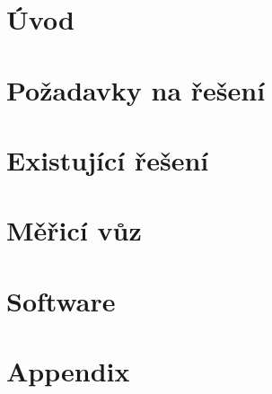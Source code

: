 \documentclass[digital, oneside, table, nolot, nolof]{fithesis3}
\begin{document}
\chapter{Úvod} \label{chap:uvod}


\chapter{Požadavky na řešení} \label{chap:pozadavky}


\chapter{Existující řešení} \label{chap:prehled}


\chapter{Měřicí vůz} \label{chap:merici-vuz}


\chapter{Software} \label{chap:sw}


\printbibliography[heading=bibintoc]

\appendix
\chapter{Appendix} \label{chap:appendix}

\end{document}

